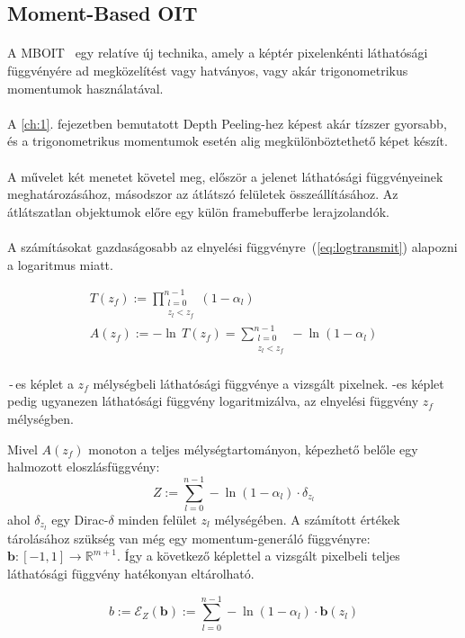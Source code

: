 \subsection{Moment-Based OIT}
\label{sec:MBOIT}
\paragraph{}A \ac{MBOIT}~\cite{10.1145/3203206} egy relatíve új technika, amely a képtér pixelenkénti láthatósági függvényére ad megközelítést vagy hatványos, vagy akár trigonometrikus momentumok használatával.

\paragraph{}A \ref{ch:1}. fejezetben bemutatott Depth Peeling-hez képest akár tízszer gyorsabb, és a trigonometrikus momentumok esetén alig megkülönböztethető képet készít.

\paragraph{}A művelet két menetet követel meg, először a jelenet láthatósági függvényeinek meghatározásához, másodszor az átlátszó felületek összeállításához. Az átlátszatlan objektumok előre egy külön framebufferbe lerajzolandók.

\paragraph{}A számításokat gazdaságosabb az elnyelési függvényre~(\autoref{eq:logtransmit}) alapozni a logaritmus miatt.

\begin{gather}
	\label{eq:pointtransmittance} T(z_f) := \prod_{\substack{l=0\\z_l<z_f}}^{n-1}(1-\alpha_l)\\
	\label{eq:logtransmit}A(z_f) := -\ln\,T(z_f) = \sum_{\substack{l=0\\z_l<z_f}}^{n-1}-\ln(1-\alpha_l)
\end{gather}

\paragraph{}\,-\,es képlet a $z_f$ mélységbeli láthatósági függvénye a vizsgált pixelnek.
 -es képlet pedig ugyanezen láthatósági függvény logaritmizálva, az elnyelési függvény $z_f$ mélységben.

Mivel $A(z_f)$ monoton a teljes mélységtartományon, képezhető belőle egy halmozott eloszlásfüggvény:
$$Z := \sum_{l=0}^{n-1}-\ln(1-\alpha_l)\cdot\delta_{z_l}$$
ahol $\delta_{z_l}$ egy Dirac-$\delta$ minden felület $z_l$ mélységében. A számított értékek tárolásához szükség van még egy momentum-generáló függvényre: $\boldsymbol{b} : [-1,1] \rightarrow \mathbb{R}^{m+1}$. Így a következő képlettel a vizsgált pixelbeli teljes láthatósági függvény hatékonyan eltárolható.


$$b:=\mathcal{E}_Z(\boldsymbol{b}):=\sum_{l=0}^{n-1}-\ln(1-\alpha_l)\cdot\boldsymbol{b}(z_l)$$
